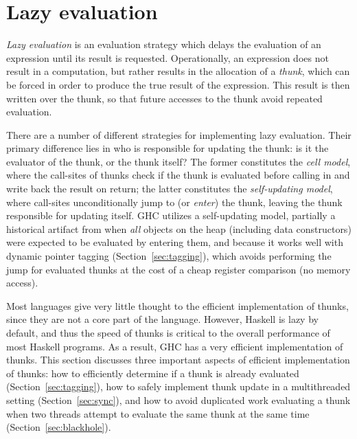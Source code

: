 \section{Lazy evaluation}


\emph{Lazy evaluation} is an evaluation strategy which delays the
evaluation of an expression until its result is requested.
Operationally, an expression does not result in a computation, but
rather results in the allocation of a \emph{thunk}, which can be forced
in order to produce the true result of the expression.  This result
is then written over the thunk, so that future accesses to the thunk
avoid repeated evaluation.

There are a number of different strategies for implementing lazy
evaluation.  Their primary difference lies in who is responsible for
updating the thunk: is it the evaluator of the thunk, or the thunk
itself?  The former constitutes the \emph{cell model}, where the
call-sites of thunks check if the thunk is evaluated before calling in
and write back the result on return; the latter constitutes the
\emph{self-updating model}, where call-sites unconditionally jump to (or
\emph{enter}) the thunk, leaving the thunk responsible for updating
itself.  GHC utilizes a self-updating model, partially a historical
artifact from when \emph{all} objects on the heap (including data
constructors) were expected to be evaluated by entering them, and
because it works well with dynamic pointer tagging
(Section~\ref{sec:tagging}), which avoids performing the jump for
evaluated thunks at the cost of a cheap register comparison (no memory
access).

Most languages give very little thought to the efficient implementation
of thunks, since they are not a core part of the language.  However,
Haskell is lazy by default, and thus the speed of thunks is critical to
the overall performance of most Haskell programs.  As a result, GHC has
a very efficient implementation of thunks.  This section discusses three
important aspects of efficient implementation of thunks: how to
efficiently determine if a thunk is already evaluated
(Section~\ref{sec:tagging}), how to safely implement thunk update in a
multithreaded setting (Section~\ref{sec:sync}), and how to avoid
duplicated work evaluating a thunk when two threads attempt to evaluate
the same thunk at the same time (Section~\ref{sec:blackhole}).

